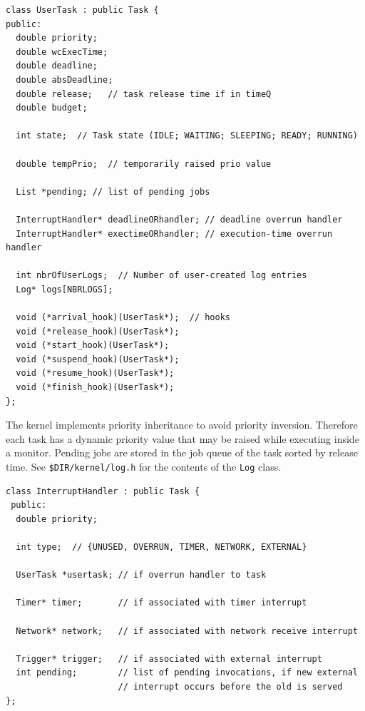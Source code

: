 \documentclass[final,twoside]{rapport}
\begin{document}
\begin{small}
\begin{verbatim}
class UserTask : public Task {
public:
  double priority; 
  double wcExecTime;
  double deadline;
  double absDeadline; 
  double release;   // task release time if in timeQ
  double budget;
  
  int state;  // Task state (IDLE; WAITING; SLEEPING; READY; RUNNING)
  
  double tempPrio;  // temporarily raised prio value 

  List *pending; // list of pending jobs

  InterruptHandler* deadlineORhandler; // deadline overrun handler
  InterruptHandler* exectimeORhandler; // execution-time overrun handler
  
  int nbrOfUserLogs;  // Number of user-created log entries 
  Log* logs[NBRLOGS]; 
  
  void (*arrival_hook)(UserTask*);  // hooks
  void (*release_hook)(UserTask*);
  void (*start_hook)(UserTask*);
  void (*suspend_hook)(UserTask*);
  void (*resume_hook)(UserTask*);
  void (*finish_hook)(UserTask*);
};
\end{verbatim}
\end{small}

The kernel implements priority inheritance to avoid priority
inversion. Therefore each task has a dynamic priority value that may
be raised while executing inside a monitor. Pending jobs are stored in
the job queue of the task sorted by release time. See
\texttt{\$DIR/kernel/log.h} for the contents of the \texttt{Log}
class.

\begin{small}
\begin{verbatim}
class InterruptHandler : public Task {
 public:
  double priority;
  
  int type;  // {UNUSED, OVERRUN, TIMER, NETWORK, EXTERNAL}

  UserTask *usertask; // if overrun handler to task

  Timer* timer;       // if associated with timer interrupt 

  Network* network;   // if associated with network receive interrupt

  Trigger* trigger;   // if associated with external interrupt
  int pending;        // list of pending invocations, if new external
                      // interrupt occurs before the old is served
};
\end{verbatim}
\end{small}
\end{document}
